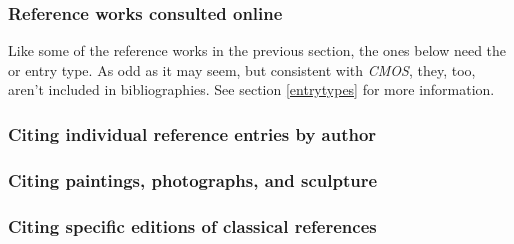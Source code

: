 \documentclass[11pt,letterpaper,oneside]{article}
\begin{document}
\subsubsection{Reference works consulted online}
\label{14.233}

Like some of the reference works in the previous section, the ones
below need the  or  entry
type. As odd as it may seem, but consistent with \textit{CMOS}, they,
too, aren't included in bibliographies. See section \ref{entrytypes}
for more information.

\begin{citeonly}
\item \cite{toscanini2016}
\item \cite{cairns2016}
\item \cite{wikipedia2016}
\item \cite{merriam2016}
\end{citeonly}

\subsubsection{Citing individual reference entries by author}

\begin{citebib}
\item \cite{isaacson2005}
\end{citebib}

\subsubsection{Citing paintings, photographs, and sculpture}

\begin{citebib}
\item \cite{dali1931}
\item \cite{mccurry1984}
\item \cite{picasso1942}
\end{citebib}

\setcounter{subsubsection}{245}
\subsubsection{Citing specific editions of classical references}
\end{document}
